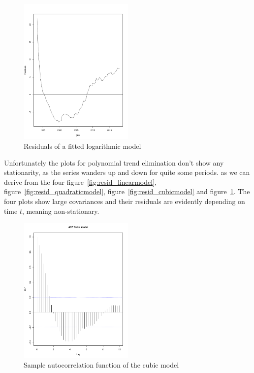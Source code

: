 \documentclass[11pt,a4paper]{article}
\begin{document}
\begin{figure}[!htb]
\centering
\includegraphics[angle=0,
width=0.5\textwidth]{resid_logmodel}
\caption{Residuals of a fitted logarithmic model
\label{fig:resid_logmodel}}
\end{figure}
Unfortunately the plots for polynomial trend elimination don't show any stationarity, as the series wanders up and down for quite some periods. as we can derive from the four figure~\ref{fig:resid_linearmodel}, figure~\ref{fig:resid_quadraticmodel}, figure~\ref{fig:resid_cubicmodel} and figure~\ref{fig:resid_logmodel}. The four plots show large covariances and their residuals are evidently depending on time $t$, meaning non-stationary.
\\
\begin{figure}[!htb]
\centering
\includegraphics[angle=0,
width=0.5\textwidth]{acf_cubicmodel}
\caption{Sample autocorrelation function of the cubic model
\label{fig:acf_cubicmodel}}
\end{figure}
\end{document}
